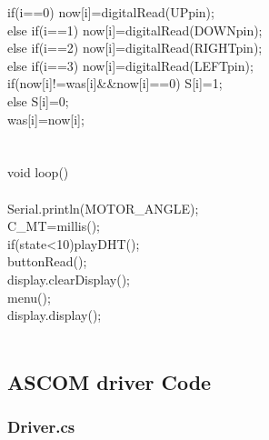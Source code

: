 \begin{verbbox}
{{{		if(i==0) now[i]=digitalRead(UPpin);\\
		else if(i==1) now[i]=digitalRead(DOWNpin);\\
		else if(i==2) now[i]=digitalRead(RIGHTpin);\\
		else if(i==3) now[i]=digitalRead(LEFTpin);\\
		if(now[i]!=was[i]\&\&now[i]==0) S[i]=1;\\
		else S[i]=0;\\
		was[i]=now[i];\\
	}\\
}\\
void loop()\\
{\\
	Serial.println(MOTOR\_ANGLE);\\
	C\_MT=millis();\\
	if(state<10)playDHT();\\
	buttonRead();\\
	display.clearDisplay();\\
	menu();\\
	display.display();\\
}\\

}
\end{verbbox}

\subsection{ASCOM driver Code}
\subsubsection{Driver.cs}


